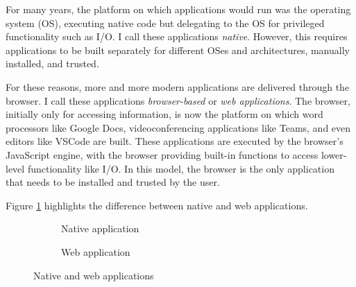 \label{sec:webdev}

For many years, the platform on which applications would run was the operating system (OS), executing native code but delegating to the OS for privileged functionality such as I/O. I call these applications \emph{native}. However, this requires applications to be built separately for different OSes and architectures, manually installed, and trusted.

For these reasons, more and more modern applications are delivered through the browser. I call these applications \emph{browser-based} or \emph{web applications}. The browser, initially only for accessing information, is now the platform on which word processors like Google Docs, videoconferencing applications like Teams, and even editors like VSCode are built. These applications are executed by the browser's JavaScript engine, with the browser providing built-in functions to access lower-level functionality like I/O. In this model, the browser is the only application that needs to be installed and trusted by the user.

Figure \ref{fig:web-platform} highlights the difference between native and web applications.

\begin{figure}[H]
\centering
\begin{subfigure}{0.5\textwidth}
  \centering
\caption{Native application}
\end{subfigure}%
\begin{subfigure}{0.5\textwidth}
  \centering
\caption{Web application}
\end{subfigure}
\caption{Native and web applications}
\label{fig:web-platform}
\end{figure}
\vspace*{-2em}

